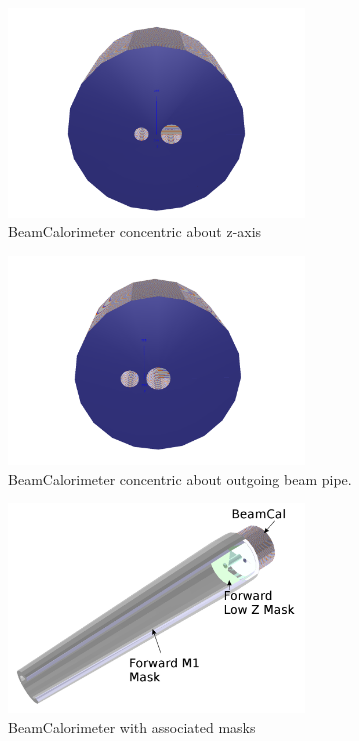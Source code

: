 \documentclass{report}
\begin{document}
            \begin{figure}[H] 
                \includegraphics[width=0.7\textwidth]{beamcal_zaxis}
                \centering
                \caption{BeamCalorimeter concentric about z-axis}
                \label{fig:beamcal_zaxis}
            \end{figure}
            \begin{figure}[H] 
                \includegraphics[width=0.7\textwidth]{beamcal_aligned}
                \centering
                \caption{BeamCalorimeter concentric about outgoing beam pipe.}
                \label{fig:beamcal_aligned}
            \end{figure}
            \begin{figure}[H] 
                \includegraphics[width=0.7\textwidth]{beamcal_masks}
                \centering
                \caption{BeamCalorimeter with associated masks}
                \label{fig:beamcal_masks}
            \end{figure}
\end{document}
